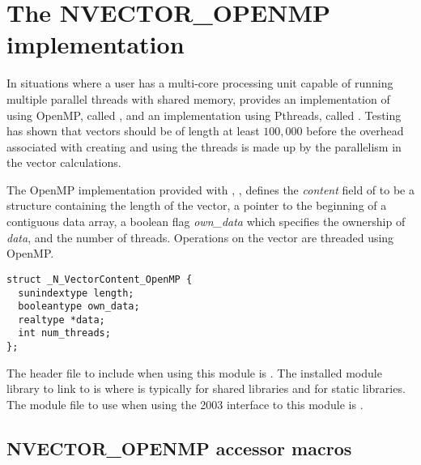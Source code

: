 \section{The NVECTOR\_OPENMP implementation}\label{ss:nvec_openmp}

In situations where a user has a multi-core processing unit capable of
running multiple parallel threads with shared memory, {\sundials} provides
an implementation of {\nvector} using OpenMP, called {\nvecopenmp}, and
an implementation using Pthreads, called {\nvecpthreads}.
Testing has shown that vectors should be of length at least $100,000$
before the overhead associated with creating and using the threads is
made up by the parallelism in the vector calculations.

The OpenMP {\nvector} implementation provided with {\sundials},
{\nvecopenmp}, defines the {\em content} field of  to be a structure
containing the length of the vector, a pointer to the beginning of a contiguous
data array, a boolean flag {\em own\_data} which specifies the ownership
of {\em data}, and the number of threads.
Operations on the vector are threaded using OpenMP.
\begin{verbatim}
struct _N_VectorContent_OpenMP {
  sunindextype length;
  booleantype own_data;
  realtype *data;
  int num_threads;
};
\end{verbatim}

The header file to include when using this module is .
The installed module library to link to is
where  is typically  for shared libraries and 
for static libraries.
The {\F} module file to use when using the {\F} 2003 interface to
this module is .


\subsection{NVECTOR\_OPENMP accessor macros}
\label{ss:nvec_openmp_macros}

